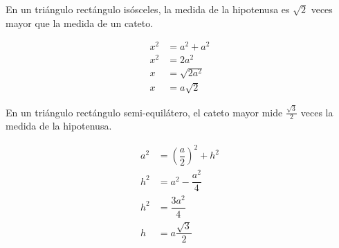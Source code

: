 \begin{theorem}

    En un triángulo rectángulo isósceles, la medida de la hipotenusa es $\sqrt{2}$ veces mayor que la medida de un cateto.

    \begin{center}
        \noindent 
        \begin{minipage}{0.2\textwidth}
            \vspace{0.5cm}
            \centering
            
            \label{fig:rectangulo-isosceles}
        \end{minipage}
        \hspace{0.01\textwidth}
        \begin{minipage}{0.4\textwidth}
            \begin{equation*}
                \begin{split}
                    x^2 &= a^2 + a^2 \\
                    x^2 &= 2a^2 \\
                    x &= \sqrt{2a^2} \\
                    x &= a\sqrt{2}
                \end{split}
            \end{equation*}
        \end{minipage}
    \end{center}
\end{theorem}

\begin{theorem}
    En un triángulo rectángulo semi-equilátero, el cateto mayor mide $\frac{\sqrt{3}}{2}$ veces la medida de la hipotenusa.

    \begin{center}
        \noindent
        \begin{minipage}{0.3\textwidth}
            \vspace{0.5cm}
            
            \label{fig:triángulo semi-equilatero}
        \end{minipage}
        \hspace{0.05\textwidth}
        \begin{minipage}{0.3\textwidth}
            \begin{equation*}
                \begin{split}
                    a^2 &=  \left(\dfrac{a}{2}\right)^2 + h^2 \\
                    h^2 &= a^2 - \dfrac{a^2}{4} \\
                    h^2 &= \dfrac{3a^2}{4}  \\
                    h &= a\dfrac{\sqrt{3}}{2}
                \end{split}
            \end{equation*}
        \end{minipage}
        \hspace{0.05\textwidth}
    \end{center}
    
\end{theorem}

